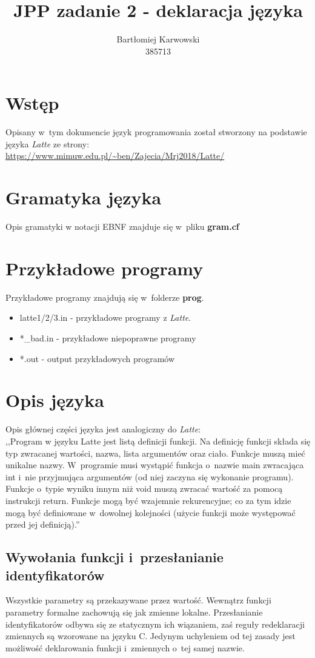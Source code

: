 \documentclass{article}
\title{JPP zadanie 2 - deklaracja języka}
\author{Bartłomiej Karwowski\\385713}
\date{}
\begin{document}
\maketitle

\section{Wstęp}
Opisany w~tym dokumencie język programowania został stworzony 
na podstawie języka \textit{Latte} ze strony:\\

\url{https://www.mimuw.edu.pl/~ben/Zajecia/Mrj2018/Latte/}

\section{Gramatyka języka}
Opis gramatyki w notacji EBNF znajduje się w~pliku \textbf{gram.cf}

\section{Przykładowe programy}
Przykładowe programy znajdują się w~folderze \textbf{prog}.
\begin{itemize}
    \item latte1/2/3.in - przykładowe programy z \textit{Latte}.
    \item *\_bad.in - przykładowe niepoprawne programy
    \item *.out - output przykładowych programów
\end{itemize}

\newpage
\section{Opis języka}
Opis głównej części języka jest analogiczny do \textit{Latte}: \\
,,Program w języku Latte jest listą definicji funkcji. 
Na definicję funkcji składa się typ zwracanej wartości, nazwa, lista argumentów oraz ciało. 
Funkcje muszą mieć unikalne nazwy. 
W~programie musi wystąpić funkcja o~nazwie main zwracająca int 
i~nie przyjmująca argumentów (od niej zaczyna się wykonanie programu).
Funkcje o~typie wyniku innym niż void muszą zwracać wartość za pomocą instrukcji return. Funkcje mogą być wzajemnie rekurencyjne; co za tym idzie mogą być definiowane w~dowolnej kolejności (użycie funkcji może występować przed jej definicją).''

\subsection{Wywołania funkcji i~przesłanianie identyfikatorów}
Wszystkie parametry są przekazywane przez wartość. 
Wewnątrz funkcji parametry formalne zachowują się jak zmienne lokalne.
Przesłanianie identyfikatorów odbywa się ze statycznym ich wiązaniem,
zaś reguły redeklaracji zmiennych są wzorowane na języku C.
Jedynym uchyleniem od tej zasady jest możliwość deklarowania funkcji i~zmiennych o~tej samej nazwie.
\end{document}
